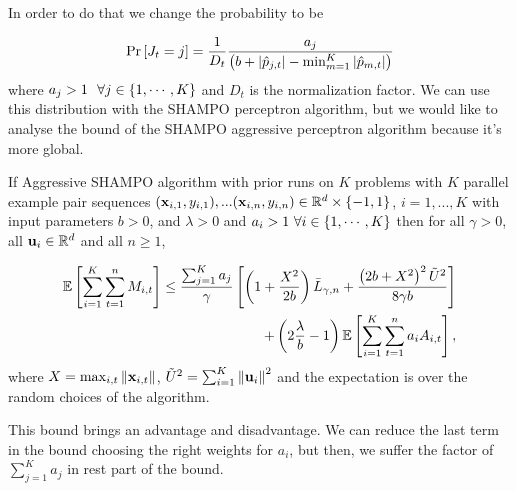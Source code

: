 In order to do that we change the probability to be 

\begin{equation*}
{\rm Pr}\left[{J_t=j}\right] =
\frac{1}{D_{t}}\frac{a_{j}}{\left({b+\left\vert{\hat{p}_{j,t}}\right\vert-\min_{m=1}^K\left\vert{\hat{p}_{m,t}}\right\vert}\right)} \end{equation*}
where $a_j>1~~\forall j\in\left\{{1,\cdots,K}\right\}$ and  $D_t$ is the normalization factor. We can use this distribution with the SHAMPO perceptron algorithm, but we would like to analyse the bound of the SHAMPO aggressive perceptron algorithm because it's more global. 

\begin{theorem}
  If Aggressive SHAMPO algorithm with prior runs on $K$ problems with $K$ parallel example pair
  sequences
  $(\mathbf{x}_{i,1},y_{i,1}),...(\mathbf{x}_{i,n},y_{i,n})\in\mathbb{R}^d\times\{-1,1\}$,
  $i=1,...,K$ with input parameters $b>0$, and $\lambda>0$  and $a_i>1~\forall i\in\left\{{1,\cdots,K}\right\}$ then for all $\gamma>0$, all
  $\mathbf{u}_{i}\in\mathbb{R}^d$ and all $n\ge1$,
  
\begin{displaymath}
\begin{split}
\mathbb{E}\left[ \sum_{i=1}^{K}\sum_{t=1}^{n}{M_{i,t}} \right]
\le\frac{\sum_{j=1}^Ka_{j}}{\gamma}\left[{\left(1+\frac{X^2}{2b} \right){\bar L}_{\gamma,n}+
\frac{\left({2b+X^2}\right)^2\tilde{U}^2}{8{\gamma}b}}\right]\\ 
+
\left({2\frac{\lambda}{b}-1}\right)\mathbb{E}\left[{\sum_{i=1}^{K}\sum_{t=1}^{n}{a_{i}A_{i,t}}}\right],
\label{bound_FO_SHAMPO_prior}
\end{split}
\end{displaymath}
 where $X=\max_{i,t}\Vert\mathbf{x}_{i,t}\Vert$,
$\tilde{U}^2=\sum_{i=1}^{K}\left\Vert {\mathbf{u}_{i}} \right\Vert^2$ and the expectation is over the
random choices of the algorithm.
\end{theorem} \label{thm:FO_bound_aggressive}
This bound brings an advantage and disadvantage. We can reduce the last term in the bound choosing the right weights for $a_i$, but then, we suffer the factor of $\sum_{j=1}^Ka_{j}$ in rest part of the bound. 
\\
